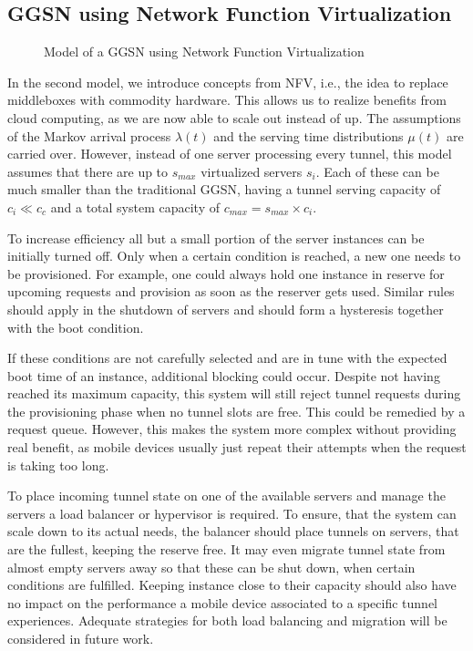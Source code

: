 \subsection{GGSN using Network Function Virtualization}\label{sec:virtual_ggsn}
\begin{figure}[htbp]
  \centering
  \resizebox{0.9\columnwidth}{!}{}
  \caption{Model of a GGSN using Network Function Virtualization}
  \label{fig:model_nfv_ggsn}
\end{figure}

In the second model, we introduce concepts from \gls{NFV}, i.e., the idea to replace middleboxes with commodity hardware.
This allows us to realize benefits from cloud computing, as we are now able to scale out instead of up. The assumptions of the Markov arrival process $\lambda(t)$ and the serving time distributions $\mu(t)$ are carried over. However, instead of one server processing every tunnel, this model assumes that there are up to $s_{max}$ virtualized servers $s_i$. Each of these can be much smaller than the traditional GGSN, having a tunnel serving capacity of $c_i \ll c_c$ and a total system capacity of $c_{max} = s_{max} \times c_i$.

To increase efficiency all but a small portion of the server instances can be initially turned off. Only when a certain condition is reached, a new one needs to be provisioned. For example, one could always hold one instance in reserve for upcoming requests and provision as soon as the reserver gets used. Similar rules should apply in the shutdown of servers and should form a hysteresis together with the boot condition. 

If these conditions are not carefully selected and are in tune with the expected boot time of an instance, additional blocking could occur. Despite not having reached its maximum capacity, this system will still reject tunnel requests during the provisioning phase when no tunnel slots are free. This could be remedied by a request queue. However, this makes the system more complex without providing real benefit, as mobile devices usually just repeat their attempts when the request is taking too long. 

To place incoming tunnel state on one of the available servers and manage the servers a load balancer or hypervisor is required. To ensure, that the system can scale down to its actual needs, the balancer should place tunnels on servers, that are the fullest, keeping the reserve free. It may even migrate tunnel state from almost empty servers away so that these can be shut down, when certain conditions are fulfilled. Keeping instance close to their capacity should also have no impact on the performance a mobile device associated to a specific tunnel experiences. Adequate strategies for both load balancing and migration will be considered in future work.
